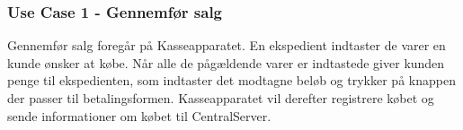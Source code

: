 \subsubsection{Use Case 1 - Gennemfør salg}
Gennemfør salg foregår på Kasseapparatet. En ekspedient indtaster de varer en kunde ønsker at købe. Når alle de pågældende varer er indtastede giver kunden penge til ekspedienten, som indtaster det modtagne beløb og trykker på knappen der passer til betalingsformen. Kasseapparatet vil derefter registrere købet og sende informationer om købet til CentralServer.